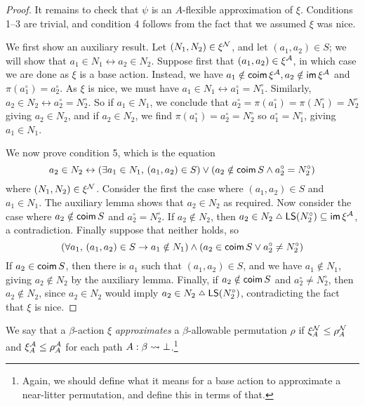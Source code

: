 \begin{proof}
  It remains to check that \( \psi \) is an \( A \)-flexible approximation of \( \xi \).
  Conditions 1--3 are trivial, and condition 4 follows from the fact that we assumed \( \xi \) was nice.

  We first show an auxiliary result.
  Let \( (N_1, N_2) \in \xi^{\mathcal N} \), and let \( (a_1, a_2) \in S \); we will show that \( a_1 \in N_1 \leftrightarrow a_2 \in N_2 \).
  Suppose first that \( (a_1, a_2) \in \xi^{\mathcal A} \), in which case we are done as \( \xi \) is a base action.
  Instead, we have \( a_1 \notin \operatorname{\mathsf{coim}} \xi^{\mathcal A}, a_2 \notin \operatorname{\mathsf{im}} \xi^{\mathcal A} \) and \( \pi(a_1^\circ) = a_2^\circ \).
  As \( \xi \) is nice, we must have \( a_1 \in N_1 \leftrightarrow a_1^\circ = N_1^\circ \).
  Similarly, \( a_2 \in N_2 \leftrightarrow a_2^\circ = N_2^\circ \).
  So if \( a_1 \in N_1 \), we conclude that \( a_2^\circ = \pi(a_1^\circ) = \pi(N_1^\circ) = N_2^\circ \) giving \( a_2 \in N_2 \), and if \( a_2 \in N_2 \), we find \( \pi(a_1^\circ) = a_2^\circ = N_2^\circ \) so \( a_1^\circ = N_1^\circ \), giving \( a_1 \in N_1 \).

  We now prove condition 5, which is the equation
  \[ a_2 \in N_2 \leftrightarrow (\exists a_1 \in N_1,\, (a_1, a_2) \in S) \vee (a_2 \notin \operatorname{\mathsf{coim}} S \wedge a_2^\circ = N_2^\circ) \]
  where \( (N_1, N_2) \in \xi^{\mathcal N} \).
  Consider the first the case where \( (a_1, a_2) \in S \) and \( a_1 \in N_1 \).
  The auxiliary lemma shows that \( a_2 \in N_2 \) as required.
  Now consider the case where \( a_2 \notin \operatorname{\mathsf{coim}} S \) and \( a_2^\circ = N_2^\circ \).
  If \( a_2 \notin N_2 \), then \( a_2 \in N_2 \symmdiff \LS(N_2^\circ) \subseteq \im \xi^\Atom \), a contradiction.
  Finally suppose that neither holds, so
  \[ (\forall a_1,\, (a_1, a_2) \in S \to a_1 \notin N_1) \wedge (a_2 \in \operatorname{\mathsf{coim}} S \vee a_2^\circ \neq N_2^\circ) \]
  If \( a_2 \in \operatorname{\mathsf{coim}} S \), then there is \( a_1 \) such that \( (a_1, a_2) \in S \), and we have \( a_1 \notin N_1 \), giving \( a_2 \notin N_2 \) by the auxiliary lemma.
  Finally, if \( a_2 \notin \operatorname{\mathsf{coim}} S \) and \( a_2^\circ \neq N_2^\circ \), then \( a_2 \notin N_2 \), since \( a_2 \in N_2 \) would imply \( a_2 \in N_2 \symmdiff \LS(N_2^\circ) \), contradicting the fact that \( \xi \) is nice.
\end{proof}
\begin{definition}[approximates]
  \label{def:StrAction.Approximates}
  We say that a \( \beta \)-action \( \xi \) \emph{approximates} a \( \beta \)-allowable permutation \( \rho \) if \( \xi_A^{\mathcal N} \leq \rho_A^{\mathcal N} \) and \( \xi_A^{\mathcal A} \leq \rho_A^{\mathcal A} \) for each path \( A : \beta \rightsquigarrow \bot \).\footnote{Again, we should define what it means for a base action to approximate a near-litter permutation, and define this in terms of that.}
\end{definition}
